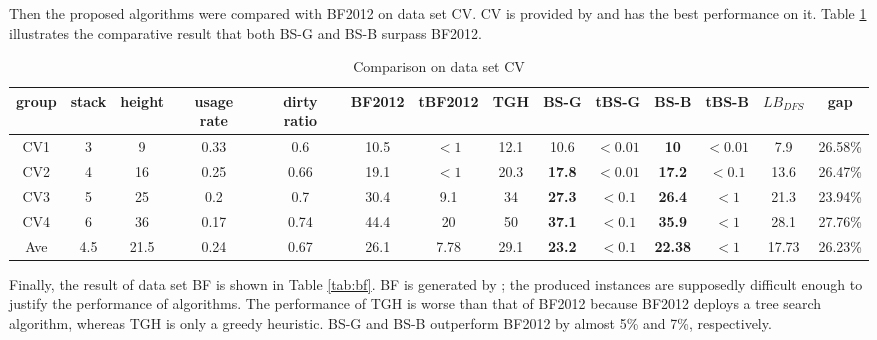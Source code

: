 \documentclass[review,3p,times,authoryear,12pt]{elsarticle}
\begin{document}
Then the proposed algorithms were compared with BF2012 on data set CV.
CV is provided by \cite{Caserta2009} and \cite{BF2012} has the best performance on it.
Table \ref{tab:cv} illustrates the comparative result that both BS-G and BS-B surpass BF2012.

\begin{table}[!htb]
\scriptsize
  \centering
  \caption{\label{tab:cv} Comparison on data set CV}
    \begin{tabular}{c|c|c|c|c|c|c|c|c|c|c|c|c|c}
    \hline
    group & stack & height & usage rate & dirty ratio & BF2012 & tBF2012 & TGH   & BS-G  & tBS-G & BS-B  & tBS-B & $\mathit{LB}_\mathit{DFS}$ & gap\\
    \hline
    CV1  & 3  & 9   & 0.33 & 0.6  & 10.5 & $<1$ & 12.1 & 10.6          & $<0.01$ & \textbf{10}   & $<0.01$ &7.9 & 26.58\%\\
    CV2  & 4  & 16  & 0.25 & 0.66 & 19.1 & $<1$ & 20.3 & \textbf{17.8} & $<0.01$ & \textbf{17.2} & $<0.1$ &13.6 & 26.47\%\\
    CV3  & 5  & 25  & 0.2  & 0.7  & 30.4 & 9.1  & 34   & \textbf{27.3} & $<0.1$  & \textbf{26.4} & $<1$   &21.3 & 23.94\%\\
    CV4  & 6  & 36  & 0.17 & 0.74 & 44.4 & 20   & 50   & \textbf{37.1} & $<0.1$  & \textbf{35.9} & $<1$   &28.1 & 27.76\%\\
    \hline
    Ave  & 4.5& 21.5& 0.24 & 0.67 & 26.1 & 7.78 & 29.1 & \textbf{23.2} & $<0.1$  & \textbf{22.38}& $<1$   & 17.73 & 26.23\%\\
    \hline
    \end{tabular}%
\end{table}%

Finally, the result of data set BF is shown in Table \ref{tab:bf}. BF is generated by \cite{BF2012}; the produced instances are supposedly difficult enough to justify the performance of algorithms. The performance of TGH is worse than that of BF2012 because BF2012 deploys a tree search algorithm, whereas TGH is only a greedy heuristic. BS-G and BS-B outperform BF2012 by almost 5\% and 7\%, respectively.
\end{document}
